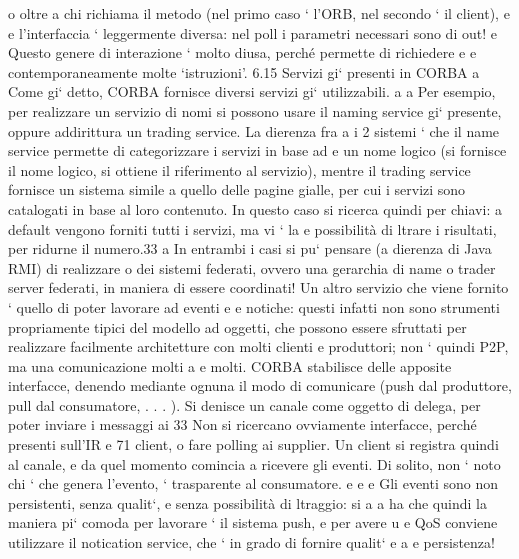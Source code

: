 \documentclass[a4paper,12pt]{article}
\begin{document}
o
oltre a chi richiama il metodo (nel primo caso ` l'ORB, nel secondo ` il client),
e
e
l'interfaccia ` leggermente diversa: nel poll i parametri necessari sono di out!
e
Questo genere di interazione ` molto diusa, perché permette di richiedere
e
e
contemporaneamente molte {`}istruzioni'.
6.15
Servizi gi` presenti in CORBA
a
Come gi` detto, CORBA fornisce diversi servizi gi` utilizzabili.
a
a
Per esempio, per realizzare un servizio di nomi si possono usare il naming
service gi` presente, oppure addirittura un trading service. La dierenza fra
a
i 2 sistemi ` che il name service permette di categorizzare i servizi in base ad
e
un nome logico (si fornisce il nome logico, si ottiene il riferimento al servizio),
mentre il trading service fornisce un sistema simile a quello delle pagine gialle,
per cui i servizi sono catalogati in base al loro contenuto. In questo caso si
ricerca quindi per chiavi: a default vengono forniti tutti i servizi, ma vi ` la
e
possibilità di ltrare i risultati, per ridurne il numero.33
a
In entrambi i casi si pu` pensare (a dierenza di Java RMI) di realizzare
o
dei sistemi federati, ovvero una gerarchia di name o trader server federati, in
maniera di essere coordinati!
Un altro servizio che viene fornito ` quello di poter lavorare ad eventi e
e
notiche: questi infatti non sono strumenti propriamente tipici del modello ad
oggetti, che possono essere sfruttati per realizzare facilmente architetture con
molti clienti e produttori; non ` quindi P2P, ma una comunicazione molti a
e
molti.
CORBA stabilisce delle apposite interfacce, denendo mediante ognuna il
modo di comunicare (push dal produttore, pull dal consumatore, . . . ). Si
denisce un canale come oggetto di delega, per poter inviare i messaggi ai
33 Non
si ricercano ovviamente interfacce, perché presenti sull'IR
e
71
client, o fare polling ai supplier. Un client si registra quindi al canale, e da
quel momento comincia a ricevere gli eventi.
Di solito, non ` noto chi ` che genera l'evento, ` trasparente al consumatore.
e
e
e
Gli eventi sono non persistenti, senza qualit`, e senza possibilità di ltraggio: si
a
a
ha che quindi la maniera pi` comoda per lavorare ` il sistema push, e per avere
u
e
QoS conviene utilizzare il notication service, che ` in grado di fornire qualit`
e
a
e persistenza!
\end{document}
